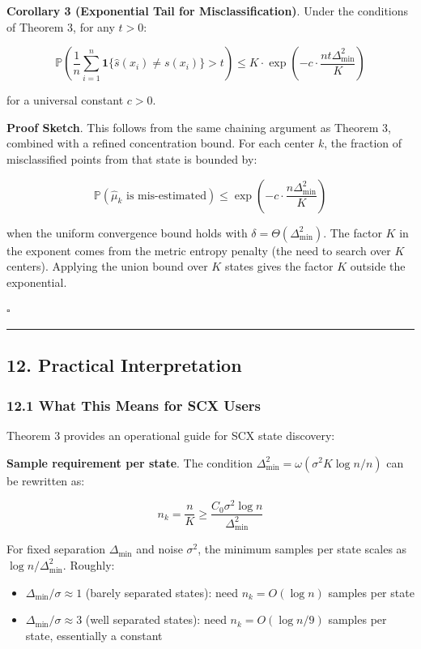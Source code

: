 \documentclass[
  12pt,
]{article}
\providecommand{\tightlist}{%
  \setlength{\itemsep}{0pt}\setlength{\parskip}{0pt}}
\begin{document}
\textbf{Corollary 3 (Exponential Tail for Misclassification)}. Under the
conditions of Theorem 3, for any \(t > 0\):

\[\mathbb{P}\left(\frac{1}{n} \sum_{i=1}^n \mathbf{1}\{\hat{s}(x_i) \neq s(x_i)\} > t\right) \leq K \cdot \exp\left(-c \cdot \frac{n t \Delta_{\min}^2}{K}\right)\]

for a universal constant \(c > 0\).

\textbf{Proof Sketch}. This follows from the same chaining argument as
Theorem 3, combined with a refined concentration bound. For each center
\(k\), the fraction of misclassified points from that state is bounded
by:

\[\mathbb{P}(\hat{\mu}_k \text{ is mis-estimated}) \leq \exp\left(-c \cdot \frac{n \Delta_{\min}^2}{K}\right)\]

when the uniform convergence bound holds with
\(\delta = \Theta(\Delta_{\min}^2)\). The factor \(K\) in the exponent
comes from the metric entropy penalty (the need to search over \(K\)
centers). Applying the union bound over \(K\) states gives the factor
\(K\) outside the exponential.

\(\square\)

\begin{center}\rule{0.5\linewidth}{0.5pt}\end{center}

\subsection{12. Practical
Interpretation}\label{practical-interpretation}

\subsubsection{12.1 What This Means for SCX
Users}\label{what-this-means-for-scx-users}

Theorem 3 provides an operational guide for SCX state discovery:

\textbf{Sample requirement per state}. The condition
\(\Delta_{\min}^2 = \omega(\sigma^2 K \log n / n)\) can be rewritten as:

\[n_k = \frac{n}{K} \geq \frac{C_0 \sigma^2 \log n}{\Delta_{\min}^2}\]

For fixed separation \(\Delta_{\min}\) and noise \(\sigma^2\), the
minimum samples per state scales as \(\log n / \Delta_{\min}^2\).
Roughly:

\begin{itemize}
\tightlist
\item
  \(\Delta_{\min} / \sigma \approx 1\) (barely separated states): need
  \(n_k = O(\log n)\) samples per state
\item
  \(\Delta_{\min} / \sigma \approx 3\) (well separated states): need
  \(n_k = O(\log n / 9)\) samples per state, essentially a constant
\end{itemize}
\end{document}
